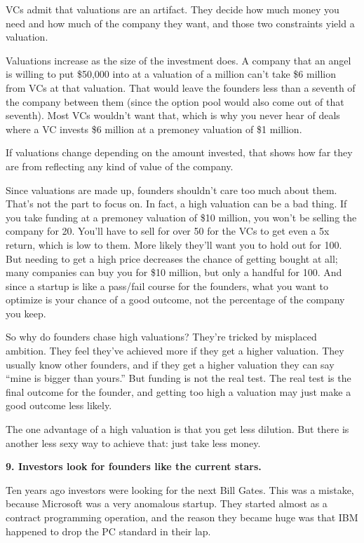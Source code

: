 \documentclass[12pt]{book}
\begin{document}
VCs admit that valuations are an artifact. They decide how much money
you need and how much of the company they want, and those two
constraints yield a valuation.

Valuations increase as the size of the investment does. A company that
an angel is willing to put \$50,000 into at a valuation of a million
can't take \$6 million from VCs at that valuation. That would leave the
founders less than a seventh of the company between them (since the
option pool would also come out of that seventh). Most VCs wouldn't want
that, which is why you never hear of deals where a VC invests \$6
million at a premoney valuation of \$1 million.

If valuations change depending on the amount invested, that shows how
far they are from reflecting any kind of value of the company.

Since valuations are made up, founders shouldn't care too much about
them. That's not the part to focus on. In fact, a high valuation can be
a bad thing. If you take funding at a premoney valuation of \$10
million, you won't be selling the company for 20. You'll have to sell
for over 50 for the VCs to get even a 5x return, which is low to them.
More likely they'll want you to hold out for 100. But needing to get a
high price decreases the chance of getting bought at all; many companies
can buy you for \$10 million, but only a handful for 100. And since a
startup is like a pass/fail course for the founders, what you want to
optimize is your chance of a good outcome, not the percentage of the
company you keep.

So why do founders chase high valuations? They're tricked by misplaced
ambition. They feel they've achieved more if they get a higher
valuation. They usually know other founders, and if they get a higher
valuation they can say ``mine is bigger than yours.'' But funding is not
the real test. The real test is the final outcome for the founder, and
getting too high a valuation may just make a good outcome less likely.

The one advantage of a high valuation is that you get less dilution. But
there is another less sexy way to achieve that: just take less money.

\textbf{9. Investors look for founders like the current stars.}

Ten years ago investors were looking for the next Bill Gates. This was a
mistake, because Microsoft was a very anomalous startup. They started
almost as a contract programming operation, and the reason they became
huge was that IBM happened to drop the PC standard in their lap.
\end{document}
